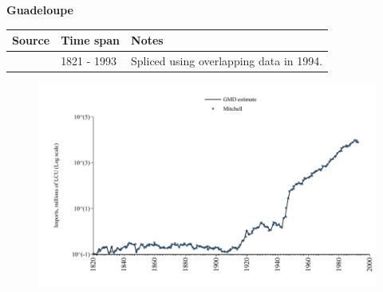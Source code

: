 \documentclass[12pt,a4paper,landscape]{article}
\begin{document}
\begin{adjustbox}{max totalsize={\paperwidth}{\paperheight},center}
\begin{minipage}[t][\textheight][t]{\textwidth}
\vspace*{0.5cm}
{}
\begin{center}
{\Large\bfseries Guadeloupe}
\end{center}
\vspace{0.5cm}
\begin{table}[H]
\centering
\small
\begin{tabular}{|l|l|l|}
\hline
\textbf{Source} & \textbf{Time span} & \textbf{Notes} \\
\hline
\rowcolor{white}\cite{Mitchell}& 1821 - 1993 &Spliced using overlapping data in 1994.\\
\hline
\end{tabular}
\end{table}
\begin{figure}[H]
\centering
\includegraphics[width=\textwidth,height=0.6\textheight,keepaspectratio]{graphs/GLP_imports.pdf}
\end{figure}
\end{minipage}
\end{adjustbox}
\end{document}
